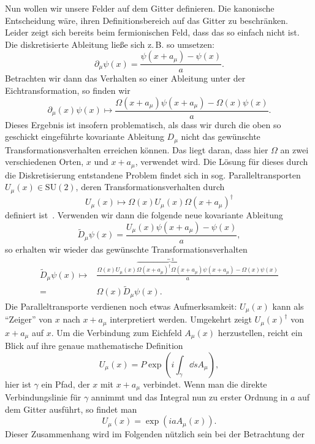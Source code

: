 Nun wollen wir unsere Felder auf dem Gitter definieren. Die kanonische
Entscheidung wäre, ihren Definitionsbereich auf das Gitter zu beschränken.
Leider zeigt sich bereits beim fermionischen Feld, dass das so einfach nicht
ist. Die diskretisierte Ableitung ließe sich z.\,B. so umsetzen:
\[
\partial_\mu \psi(x) = \frac{\psi(x + a_\mu) - \psi(x)}{a}.
\]
Betrachten wir dann das Verhalten so einer Ableitung unter der Eichtransformation,
so finden wir
\[
\partial_\mu(x) \psi(x) \mapsto
\frac{\Omega(x + a_\mu) \psi(x + a_\mu) - \Omega(x) \psi(x)}{a}.
\]
Dieses Ergebnis ist insofern problematisch, als dass wir durch die oben
so geschickt eingeführte kovariante Ableitung $D_\mu$ nicht das gewünschte
Transformationsverhalten erreichen können. Das liegt daran, dass hier
$\Omega$ an zwei verschiedenen Orten, $x$ und $x + a_\mu$, verwendet wird. Die
Lösung für dieses durch die Diskretisierung entstandene Problem findet sich in sog.
Paralleltransporten $U_\mu(x) \in \mathrm{SU}(2)$, deren Transformationsverhalten durch
\[
    U_\mu(x) \mapsto \Omega(x) U_\mu(x) \Omega(x + a_\mu)^\dag
\]
definiert ist~\cite{gattringerLang}. Verwenden wir dann die folgende neue kovariante
Ableitung
\[
    \tilde{D}_\mu \psi(x) =
    \frac{U_\mu(x) \psi(x + a_\mu) - \psi(x)}{a},
\]
so erhalten wir wieder das gewünschte Transformationsverhalten
\begin{align*}
    \tilde{D}_\mu \psi(x) \mapsto
    &\frac{\Omega (x) U_\mu(x)
    \overbrace{\Omega(x + a_\mu)^\dag \Omega(x + a_\mu)}^{= \mathds{1}}
    \psi(x + a_\mu) - \Omega(x) \psi(x)}{a} \\
    = & \Omega(x) \tilde{D}_\mu \psi(x).
\end{align*}
Die Paralleltransporte verdienen noch etwas Aufmerksamkeit: $U_\mu(x)$ kann als
\enquote{Zeiger} von $x$ nach $x + a_\mu$ interpretiert werden. Umgekehrt zeigt
$U_\mu(x)^\dag$ von $x + a_\mu$ auf $x$. \cite{urbachCPscript} Um die Verbindung
zum Eichfeld $A_\mu(x)$ herzustellen, reicht ein Blick auf ihre genaue
mathematische Definition \cite{gattringerLang}
\[
    U_\mu(x) = P \exp(i \int_\gamma \dd{s} A_\mu),
\]
hier ist $\gamma$ ein Pfad, der $x$ mit $x + a_\mu$ verbindet. Wenn man die
direkte Verbindungslinie für $\gamma$ annimmt und das Integral nun zu erster
Ordnung in $a$ auf dem Gitter ausführt, so findet man \cite{gattringerLang}
\begin{equation} \label{eq:parallelTransportexpA}
    U_\mu(x) = \exp(i a A_\mu(x)).
\end{equation}
Dieser Zusammenhang wird im Folgenden nützlich sein bei der Betrachtung der
